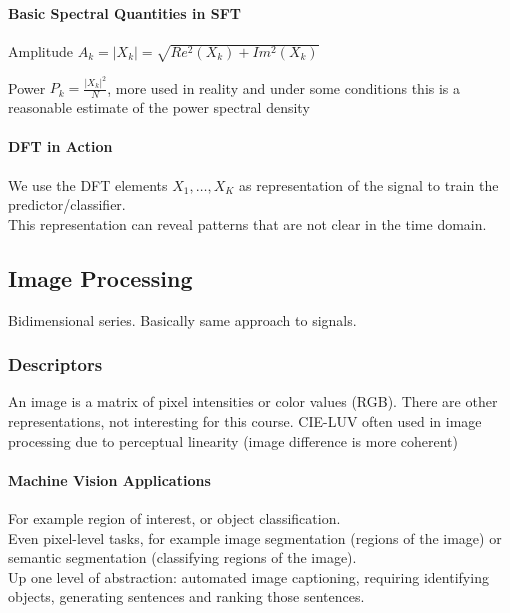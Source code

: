 \documentclass[10pt]{report}
\begin{document}
\paragraph{Basic Spectral Quantities in SFT}
\begin{list}{}{}
	\item Amplitude $A_k = |X_k| = \sqrt{Re^2(X_k)+Im^2(X_k)}$
	\item Power $P_k = \frac{|X_k|^2}{N}$, more used in reality and under some conditions this is a reasonable estimate of the power spectral density
\end{list}
\paragraph{DFT in Action} We use the DFT elements $X_1,\ldots,X_K$ as representation of the signal to train the predictor/classifier.\\
This representation can reveal patterns that are not clear in the time domain.
\subsection{Image Processing}
Bidimensional series. Basically same approach to signals.
\subsubsection{Descriptors}
An image is a matrix of pixel intensities or color values (RGB). There are other representations, not interesting for this course. CIE-LUV often used in image processing due to perceptual linearity (image difference is more coherent)
\paragraph{Machine Vision Applications} For example region of interest, or object classification.\\
Even pixel-level tasks, for example image segmentation (regions of the image) or semantic segmentation (classifying regions of the image).\\
Up one level of abstraction: automated image captioning, requiring identifying objects, generating sentences and ranking those sentences.
\end{document}
